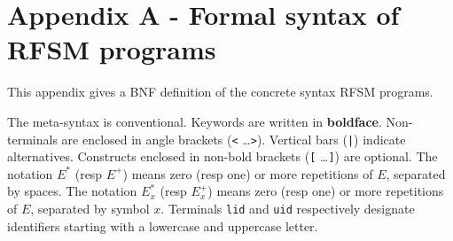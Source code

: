 \chapter*{Appendix A - Formal syntax of RFSM programs}
\label{cha:bnf}

This appendix gives a BNF definition of the concrete syntax RFSM programs.

\medskip
The meta-syntax is conventional. Keywords are written in \textbf{boldface}.  Non-terminals are
enclosed in angle brackets ({\tt <} \ldots {\tt >}).  Vertical bars ({\tt |}) indicate
alternatives.  Constructs enclosed in non-bold brackets ({\tt [} \ldots {\tt ]}) are optional.
The notation $E^*$ (resp $E^+$) means zero (resp one) or more repetitions of $E$, separated by spaces.
The notation $E^*_x$ (resp $E^+_x$) means zero (resp one) or more repetitions of $E$, separated by
symbol $x$. Terminals \verb|lid| and \verb|uid| respectively designate identifiers
starting with a lowercase and uppercase letter. 



